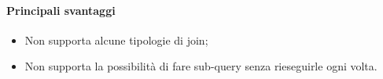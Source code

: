 \documentclass[../PianoDiQualifica.tex]{subfiles}
\begin{document}
			\paragraph{Principali svantaggi}
				\begin{itemize}
					\item Non supporta alcune tipologie di join;
					\item Non supporta la possibilità di fare sub-query senza rieseguirle ogni volta.
				\end{itemize}
		
\end{document}
